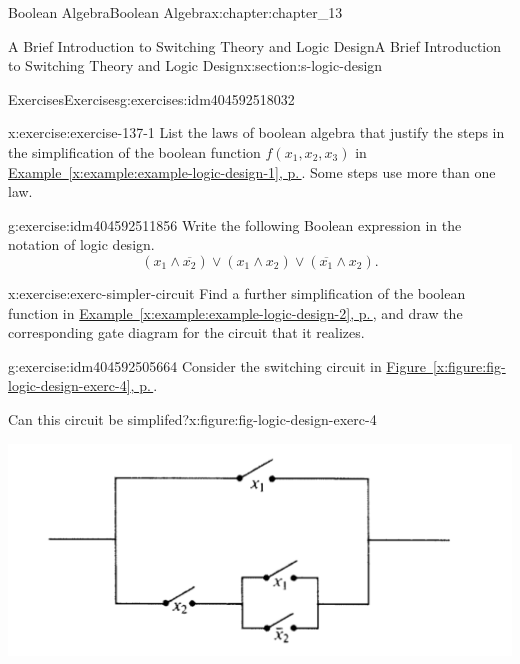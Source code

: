 \documentclass[twoside,10pt,]{book}
\newcommand{\xreffont}{\relax}
\numberwithin{equation}{section}
\begin{document}
\begin{chapterptx}{Boolean Algebra}{}{Boolean Algebra}{}{}{x:chapter:chapter_13}
\begin{sectionptx}{A Brief Introduction to Switching Theory and Logic Design}{}{A Brief Introduction to Switching Theory and Logic Design}{}{}{x:section:s-logic-design}
\begin{exercises-subsection}{Exercises}{}{Exercises}{}{}{g:exercises:idm404592518032}
\begin{divisionexercise}{1}{}{}{x:exercise:exercise-137-1}%
List the laws of boolean algebra that justify the steps in the simplification of the boolean function \(f\left(x_1, x_2, x_3\right)\) in \hyperref[x:example:example-logic-design-1]{Example~{\xreffont\ref{x:example:example-logic-design-1}}, p.\,\pageref{x:example:example-logic-design-1}}. Some steps use more than one law.%
\end{divisionexercise}%
\begin{divisionexercise}{2}{}{}{g:exercise:idm404592511856}%
Write the following Boolean expression in the notation of logic design.%
\begin{equation*}
\left(x_1\land \overline{x_2}\right)\lor \left(x_1\land x_2\right)\lor \left(\overline{x_1}\land x_2\right).
\end{equation*}
%
\end{divisionexercise}%
\begin{divisionexercise}{3}{}{}{x:exercise:exerc-simpler-circuit}%
Find a further simplification of the boolean function in \hyperref[x:example:example-logic-design-2]{Example~{\xreffont\ref{x:example:example-logic-design-2}}, p.\,\pageref{x:example:example-logic-design-2}}, and draw the corresponding gate diagram for the circuit that it realizes.%
\end{divisionexercise}%
\begin{divisionexercise}{4}{}{}{g:exercise:idm404592505664}%
Consider the switching circuit in  \hyperref[x:figure:fig-logic-design-exerc-4]{Figure~{\xreffont\ref{x:figure:fig-logic-design-exerc-4}}, p.\,\pageref{x:figure:fig-logic-design-exerc-4}}.%
\begin{figureptx}{Can this circuit be simplifed?}{x:figure:fig-logic-design-exerc-4}{}%
\begin{image}{0}{1}{0}%
\includegraphics[width=\linewidth]{images/fig-logic-design-exerc-4.png}
\end{image}%
\tcblower
\end{figureptx}%

\end{divisionexercise}
\end{exercises-subsection}
\end{sectionptx}
\end{chapterptx}
\end{document}
